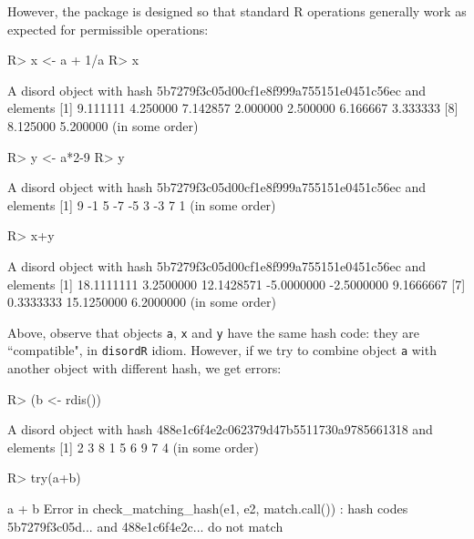 \documentclass{article}
\begin{document}
However, the package is designed so that standard R operations
generally work as expected for permissible operations:

\begin{Schunk}
\begin{Sinput}
R> x <- a + 1/a
R> x
\end{Sinput}
\begin{Soutput}
A disord object with hash 5b7279f3c05d00cf1e8f999a755151e0451c56ec and elements
[1] 9.111111 4.250000 7.142857 2.000000 2.500000 6.166667 3.333333
[8] 8.125000 5.200000
(in some order)
\end{Soutput}
\begin{Sinput}
R> y <- a*2-9
R> y
\end{Sinput}
\begin{Soutput}
A disord object with hash 5b7279f3c05d00cf1e8f999a755151e0451c56ec and elements
[1]  9 -1  5 -7 -5  3 -3  7  1
(in some order)
\end{Soutput}
\begin{Sinput}
R> x+y
\end{Sinput}
\begin{Soutput}
A disord object with hash 5b7279f3c05d00cf1e8f999a755151e0451c56ec and elements
[1] 18.1111111  3.2500000 12.1428571 -5.0000000 -2.5000000  9.1666667
[7]  0.3333333 15.1250000  6.2000000
(in some order)
\end{Soutput}
\end{Schunk}

Above, observe that objects {\tt a}, {\tt x} and {\tt y} have the
same hash code: they are ``compatible", in {\tt disordR} idiom.
However, if we try to combine object {\tt a} with another object with
different hash, we get errors:

\begin{Schunk}
\begin{Sinput}
R> (b <- rdis())
\end{Sinput}
\begin{Soutput}
A disord object with hash 488e1c6f4e2c062379d47b5511730a9785661318 and elements
[1] 2 3 8 1 5 6 9 7 4
(in some order)
\end{Soutput}
\begin{Sinput}
R> try(a+b)
\end{Sinput}
\begin{Soutput}
a + b
Error in check_matching_hash(e1, e2, match.call()) : 
hash codes 5b7279f3c05d... and 488e1c6f4e2c... do not match
\end{Soutput}
\end{Schunk}
\end{document}
